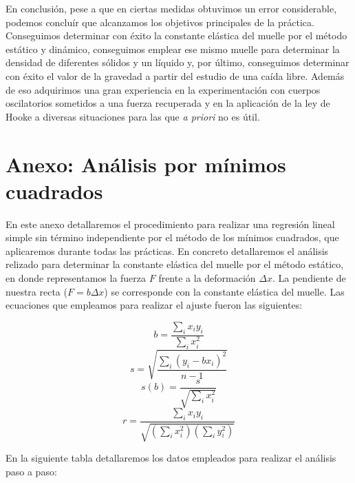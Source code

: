 \documentclass[a4paper,12pt,titlepage]{article}
\begin{document}
\par En conclusión, pese a que en ciertas medidas obtuvimos un error considerable, podemos concluír que alcanzamos los objetivos principales de la práctica. Conseguimos determinar con éxito la constante elástica del muelle por el método estático y dinámico, conseguimos emplear ese mismo muelle para determinar la densidad de diferentes sólidos y un líquido y, por último, conseguimos determinar con éxito el valor de la gravedad a partir del estudio de una caída libre. Además de eso adquirimos una gran experiencia en la experimentación con cuerpos oscilatorios sometidos a una fuerza recuperada y en la aplicación de la ley de Hooke a diversas situaciones para las que \textit{a priori} no es útil.

\newpage

\section{Anexo: Análisis por mínimos cuadrados}

En este anexo detallaremos el procedimiento para realizar una regresión lineal simple sin término independiente por el método de los mínimos cuadrados, que aplicaremos durante todas las prácticas. En concreto detallaremos el análisis relizado para determinar la constante elástica del muelle por el método estático, en donde representamos la fuerza $F$ frente a la deformación $\Delta x$. La pendiente de nuestra recta ($F=b\Delta x$) se corresponde con la constante elástica del muelle. Las ecuaciones que empleamos para realizar el ajuste fueron las siguientes:

\begin{equation}
    b=\frac{\sum_{i}x_{i}y_{i}}{\sum_{i}x_{i}^2}
\end{equation}
\begin{equation}
    s=\sqrt{\frac{\sum_{i}(y_{i}-bx_{i})^2}{n-1}}
\end{equation}
\begin{equation}
    s(b)=\frac{s}{\sqrt{\sum_{i}x_{i}^2}}
\end{equation}
\begin{equation}
    r=\frac{\sum_{i}x_{i}y_{i}}{\sqrt{(\sum_{i}x_{i}^2)(\sum_{i}y_{i}^2)}}
\end{equation}

En la siguiente tabla detallaremos los datos empleados para realizar el análisis paso a paso:
\end{document}
